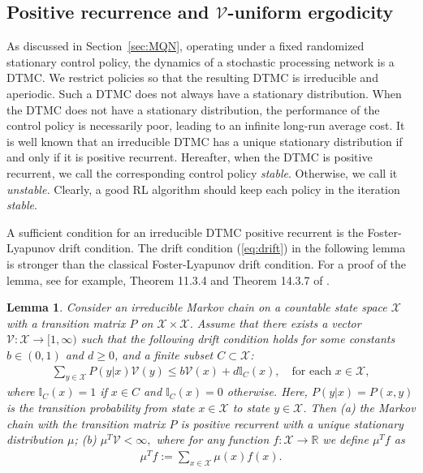 \documentclass[11pt]{article}
\newcommand{\R}{\mathbb{R}}
\newcommand{\I}{\mathbb{I}}
\newcommand{\X}{\mathcal{X}}
\newcommand{\V}{\mathcal{V}}
\newtheorem{lemma}{Lemma}
\theoremstyle{definition}
\numberwithin{equation}{section}
\begin{document}
\subsection{Positive recurrence and $\V$-uniform ergodicity}\label{sec:MC}
As discussed in Section~\ref{sec:MQN}, operating under a fixed
randomized stationary control policy, the dynamics of a stochastic
processing network is a DTMC. We restrict policies so that the
resulting DTMC is irreducible and aperiodic. Such a DTMC does not
always have a stationary distribution.  When the DTMC does not have a
stationary distribution, the performance of the control policy is
necessarily poor, leading to an infinite long-run average
cost. It is well known that an irreducible DTMC has a unique stationary distribution if and only if it is positive recurrent.
Hereafter, when the DTMC is positive recurrent, we call
the corresponding control policy \emph{stable}. Otherwise, we call it
\emph{unstable.}  Clearly, a good RL algorithm should keep each policy
in the iteration \emph{stable}.


A sufficient condition for an irreducible DTMC positive recurrent is
the Foster-Lyapunov drift condition.  The drift condition
(\ref{eq:drift}) in the following lemma is stronger than the classical
Foster-Lyapunov drift condition.
For a proof of the lemma, see for
example, Theorem 11.3.4 and Theorem 14.3.7 of \cite{Meyn2009}.

\begin{lemma}\label{lem:drift}
Consider an irreducible Markov chain on a countable state space $\X$ with a transition matrix $P$ on $\X\times \X$.  Assume that there exists a vector $\V:\X\rightarrow [1, \infty)$ such that the following drift condition holds for some constants  $b\in (0,1)$ and $d\geq0$, and a finite subset $C\subset \X$:
\begin{align}\label{eq:drift}
\sum\limits_{y\in \X}P(y|x)\V(y)\leq b \V(x) +d\I_{C}(x), \quad \text{for each }x\in \X,
\end{align}
where $\I_{C}(x)=1$ if $x\in C$ and $\I_{C}(x)=0$ otherwise. Here,
$P(y|x)=P(x,y)$ is the transition probability from state $x\in \X$ to
state $y\in \X$. Then
(a)  the Markov chain with the transition matrix  $P$ is positive recurrent with a unique stationary distribution  $\mu$; (b)
$\mu^T\V <\infty,
$
where  for any function $f: \X \rightarrow \R$  we define $\mu^T f$ as
\begin{align*}
\mu^Tf:=\sum\limits_{x\in \X} \mu(x)f(x).
\end{align*}

\end{lemma}
\end{document}
